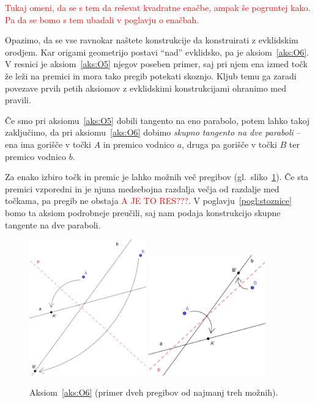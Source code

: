\textcolor{red}{Tukaj omeni, da se s tem da reševat kvadratne enačbe, ampak še pogruntej kako. Pa da se bomo s tem ubadali v poglavju o enačbah.}

Opazimo, da se vse ravnokar naštete konstrukcije da konstruirati z evklidskim orodjem. Kar origami geometrijo postavi ``nad'' evklidsko, pa je aksiom~\ref{aks:O6}. V resnici je aksiom~\ref{aks:O5} njegov poseben primer, saj pri njem ena izmed točk že leži na premici in mora tako pregib potekati skoznjo. Kljub temu ga zaradi povezave prvih petih aksiomov z evklidskimi konstrukcijami ohranimo med pravili.

Če smo pri aksiomu~\ref{aks:O5} dobili tangento na eno parabolo, potem lahko takoj zaključimo, da pri aksiomu~\ref{aks:O6} dobimo \emph{skupno tangento na dve paraboli} -- ena ima gorišče v točki $A$ in premico vodnico $a$, druga pa gorišče v točki $B$ ter premico vodnico $b$.

Za enako izbiro točk in premic je lahko možnih več pregibov (gl.\ sliko~\ref{fig:O6}). Če sta premici vzporedni in je njuna medsebojna razdalja večja od razdalje med točkama, pa pregib ne obstaja \textcolor{red}{A JE TO RES???}. V poglavju~\ref{pogl:stoznice} bomo ta aksiom podrobneje preučili, saj nam podaja konstrukcijo skupne tangente na dve paraboli.

\begin{figure}[h!]
    \centering
    \includegraphics[width=0.45\textwidth]{images/origami_aksiomi/O6b.png}
    \includegraphics[width=0.45\textwidth]{images/origami_aksiomi/O6a.png}
    \caption[Aksiom~\ref{aks:O6}]{Aksiom~\ref{aks:O6} (primer dveh pregibov od najmanj treh možnih).}
    \label{fig:O6}
\end{figure}



